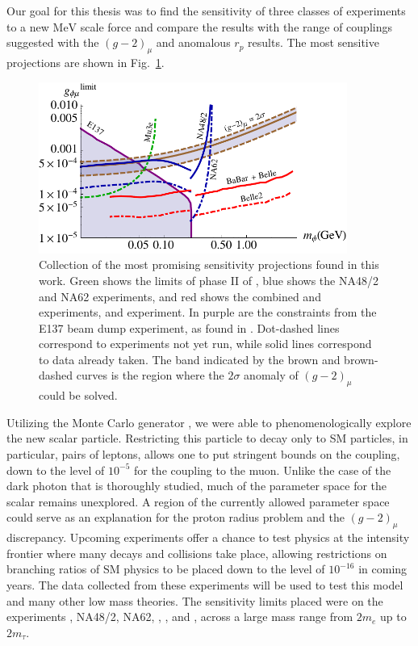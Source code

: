 \label{chapter:conclusion}

Our goal for this thesis was to find the sensitivity of three classes of experiments to a new $\textrm{MeV}$ scale force and compare the results with the range of couplings suggested with the $(g-2)_\mu$ and anomalous $r_p$ results.
The most sensitive projections are shown in Fig.~\ref{fig:best_limits}.

\begin{figure}[h]
    \centering
    \includegraphics[width=0.9\textwidth]{Figures/limits/best_limits}
    \caption[Collection of the most promising sensitivity projections found in this work.]{Collection of the most promising sensitivity projections found in this work. Green shows the limits of phase II of \mueee, blue shows the NA48/2 and NA62 experiments, and red shows the combined \belle and \babar experiments, and \belletwo experiment. In purple are the constraints from the E137 beam dump experiment, as found in \cite{Batell:2015unpub}. Dot-dashed lines correspond to experiments not yet run, while solid lines correspond to data already taken. The band indicated by the brown and brown-dashed curves is the region where the $2\sigma$ anomaly of $(g-2)_\mu$ could be solved.} 
    \label{fig:best_limits}
\end{figure}

Utilizing the Monte Carlo generator \madgraph, we were able to phenomenologically explore the new scalar particle.
Restricting this particle to decay only to SM particles, in particular, pairs of leptons, allows one to put stringent bounds on the coupling, down to the level of $10^{-5}$ for the coupling to the muon.
Unlike the case of the dark photon that is thoroughly studied, much of the parameter space for the scalar remains unexplored.
A region of the currently allowed parameter space could serve as an explanation for the proton radius problem and the $(g-2)_\mu$ discrepancy.
Upcoming experiments offer a chance to test physics at the intensity frontier where many decays and collisions take place, allowing restrictions on branching ratios of SM physics to be placed down to the level of $10^{-16}$ in coming years.
The data collected from these experiments will be used to test this model and many other low mass theories.
The sensitivity limits placed were on the experiments \mueee, NA48/2, NA62, \babar, \belle, and \belletwo, across a large mass range from $2m_e$ up to $2m_\tau$.

